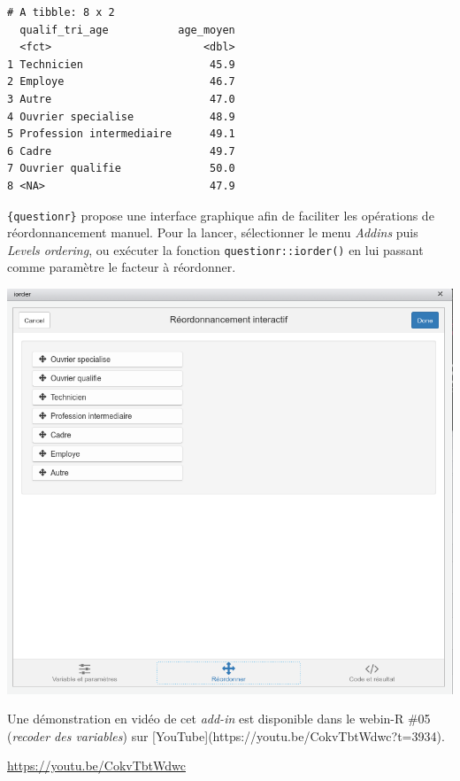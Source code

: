 \documentclass[
  letterpaper,
  DIV=11,
  numbers=noendperiod,
  oneside]{scrreprt}
\begin{document}
\begin{verbatim}
# A tibble: 8 x 2
  qualif_tri_age           age_moyen
  <fct>                        <dbl>
1 Technicien                    45.9
2 Employe                       46.7
3 Autre                         47.0
4 Ouvrier specialise            48.9
5 Profession intermediaire      49.1
6 Cadre                         49.7
7 Ouvrier qualifie              50.0
8 <NA>                          47.9
\end{verbatim}

\begin{tcolorbox}[enhanced jigsaw, colbacktitle=quarto-callout-tip-color!10!white, opacityback=0, toprule=.15mm, colback=white, coltitle=black, bottomtitle=1mm, toptitle=1mm, titlerule=0mm, rightrule=.15mm, title=\textcolor{quarto-callout-tip-color}{\faLightbulb}\hspace{0.5em}{Astuce}, breakable, bottomrule=.15mm, opacitybacktitle=0.6, arc=.35mm, left=2mm, leftrule=.75mm, colframe=quarto-callout-tip-color-frame]

\texttt{\{questionr\}} propose une interface graphique afin de faciliter
les opérations de réordonnancement manuel. Pour la lancer, sélectionner
le menu \emph{Addins} puis \emph{Levels ordering}, ou exécuter la
fonction \texttt{questionr::iorder()} en lui passant comme paramètre le
facteur à réordonner.

\includegraphics{manipulation/ressources/iorder.png}

Une démonstration en vidéo de cet \emph{add-in} est disponible dans le
webin-R \#05 (\emph{recoder des variables}) sur
{[}YouTube{]}(https://youtu.be/CokvTbtWdwc?t=3934).

\url{https://youtu.be/CokvTbtWdwc}

\end{tcolorbox}
\end{document}
